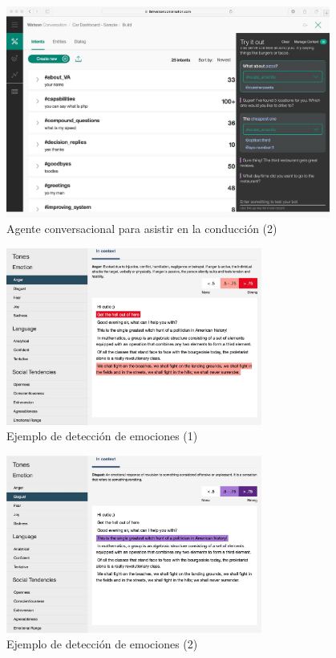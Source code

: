 \documentclass[compress]{beamer}
\begin{document}
\begin{frame}
	\begin{figure}[H]
		\centering
		\label{car2.jpg}
		\includegraphics[width=0.95\textwidth]{./Imagenes/car2.jpeg}
		\caption{Agente conversacional para asistir en la conducción (2)}
	\end{figure}
\end{frame}

\begin{frame}
	\begin{figure}[H]
		\centering
		\label{anger.jpg}
		\includegraphics[width=0.75\textwidth]{./Imagenes/anger.jpeg}
		\caption{Ejemplo de detección de emociones (1)}
	\end{figure}
\end{frame}

\begin{frame}
	\begin{figure}[H]
		\centering
		\label{disgust.jpg}
		\includegraphics[width=0.75\textwidth]{./Imagenes/disgust.jpeg}
		\caption{Ejemplo de detección de emociones (2)}
	\end{figure}
\end{frame}
\end{document}
